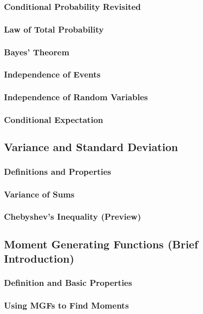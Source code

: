 \subsubsection{Conditional Probability Revisited}
\subsubsection{Law of Total Probability}
\subsubsection{Bayes' Theorem}
\subsubsection{Independence of Events}
\subsubsection{Independence of Random Variables}
\subsubsection{Conditional Expectation}

\subsection{Variance and Standard Deviation}
\subsubsection{Definitions and Properties}
\subsubsection{Variance of Sums}
\subsubsection{Chebyshev's Inequality (Preview)}

\subsection{Moment Generating Functions (Brief Introduction)}
\subsubsection{Definition and Basic Properties}
\subsubsection{Using MGFs to Find Moments}
